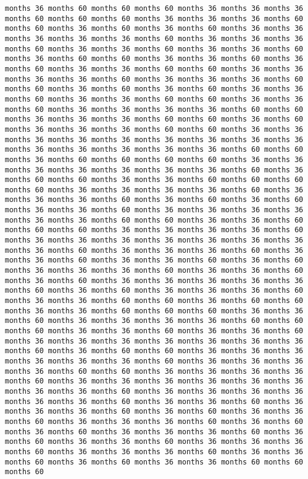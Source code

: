 \documentclass[11pt]{article}
\begin{document}
\begin{Verbatim}[commandchars=\\\{\}, frame=single, framerule=2mm, rulecolor=\color{outerrorbackground}]
months 36 months 60 months 60 months 60 months 36 months 36 months 36 months 60 months 60 months 60 months 36 months 36 months 36 months 60 months 60 months 36 months 60 months 36 months 60 months 36 months 36 months 36 months 36 months 36 months 60 months 36 months 36 months 36 months 60 months 36 months 36 months 60 months 36 months 36 months 60 months 36 months 60 months 60 months 36 months 36 months 60 months 36 months 60 months 36 months 36 months 60 months 60 months 36 months 36 months 36 months 36 months 60 months 36 months 36 months 36 months 60 months 60 months 36 months 60 months 36 months 60 months 36 months 36 months 60 months 36 months 36 months 60 months 60 months 36 months 36 months 60 months 36 months 36 months 36 months 36 months 60 months 60 months 36 months 36 months 36 months 60 months 60 months 36 months 60 months 36 months 36 months 36 months 60 months 60 months 36 months 36 months 36 months 36 months 36 months 36 months 36 months 36 months 36 months 36 months 36 months 36 months 36 months 36 months 60 months 60 months 36 months 60 months 60 months 60 months 60 months 36 months 36 months 36 months 36 months 36 months 36 months 36 months 60 months 36 months 60 months 60 months 36 months 36 months 60 months 60 months 60 months 60 months 36 months 36 months 36 months 36 months 60 months 36 months 36 months 36 months 60 months 36 months 60 months 36 months 60 months 36 months 36 months 60 months 36 months 36 months 36 months 36 months 36 months 36 months 60 months 60 months 36 months 36 months 60 months 60 months 60 months 36 months 36 months 36 months 36 months 60 months 36 months 36 months 36 months 36 months 36 months 36 months 36 months 36 months 60 months 36 months 36 months 36 months 60 months 36 months 36 months 60 months 36 months 36 months 60 months 36 months 60 months 36 months 36 months 36 months 60 months 36 months 36 months 60 months 36 months 60 months 36 months 36 months 36 months 36 months 36 months 60 months 36 months 60 months 36 months 36 months 36 months 60 months 36 months 36 months 60 months 60 months 36 months 60 months 60 months 36 months 36 months 60 months 60 months 60 months 36 months 36 months 60 months 36 months 36 months 36 months 36 months 60 months 60 months 60 months 36 months 36 months 60 months 36 months 36 months 60 months 36 months 36 months 36 months 36 months 36 months 36 months 36 months 60 months 36 months 60 months 60 months 36 months 36 months 36 months 36 months 36 months 36 months 60 months 36 months 36 months 36 months 36 months 60 months 60 months 36 months 36 months 36 months 36 months 60 months 36 months 36 months 36 months 36 months 36 months 36 months 36 months 36 months 60 months 36 months 36 months 36 months 36 months 36 months 36 months 60 months 36 months 36 months 60 months 36 months 36 months 36 months 60 months 36 months 60 months 36 months 36 months 60 months 36 months 36 months 36 months 60 months 36 months 60 months 36 months 60 months 36 months 36 months 36 months 60 months 36 months 60 months 36 months 36 months 60 months 36 months 36 months 36 months 60 months 36 months 36 months 36 months 60 months 36 months 36 months 60 months 36 months 60 months 36 months 36 months 60 months 60 months 60 
\end{Verbatim}
\end{document}
